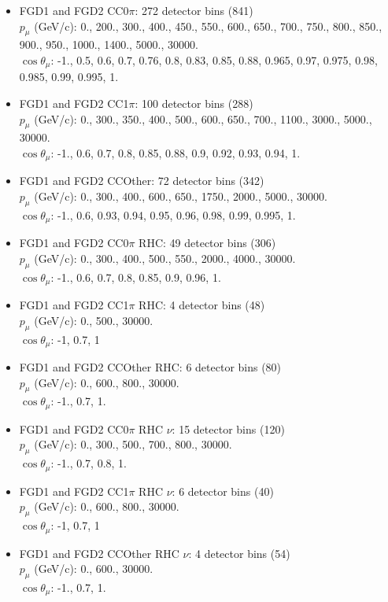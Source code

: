 \begin{itemize}
	\item FGD1 and FGD2 CC0$\pi$: 272 detector bins (841) \\
	$p_\mu$ (GeV/c): 0., 200., 300., 400., 450., 550., 600., 650., 700., 750., 800., 850., 900., 950., 1000., 1400., 5000., 30000.\\
	$\cos\theta_\mu$: -1., 0.5, 0.6, 0.7, 0.76, 0.8, 0.83, 0.85, 0.88, 0.965, 0.97, 0.975, 0.98, 0.985, 0.99, 0.995, 1.
	
	\item FGD1 and FGD2 CC1$\pi$: 100 detector bins (288) \\
	$p_\mu$ (GeV/c): 0., 300., 350., 400., 500., 600., 650., 700., 1100., 3000., 5000., 30000.\\
	$\cos\theta_\mu$: -1., 0.6, 0.7, 0.8, 0.85, 0.88, 0.9, 0.92, 0.93, 0.94, 1.
	
	\item FGD1 and FGD2 CCOther: 72 detector bins (342) \\
	$p_\mu$ (GeV/c): 0., 300., 400., 600., 650., 1750., 2000., 5000., 30000.\\
	$\cos\theta_\mu$: -1., 0.6, 0.93, 0.94, 0.95, 0.96, 0.98, 0.99, 0.995, 1.
	
	\item FGD1 and FGD2 CC0$\pi$ RHC: 49 detector bins (306) \\
	$p_\mu$ (GeV/c): 0., 300., 400., 500., 550., 2000., 4000., 30000.\\
	$\cos\theta_\mu$: -1., 0.6, 0.7, 0.8, 0.85, 0.9, 0.96, 1. 
	
	\item FGD1 and FGD2 CC1$\pi$ RHC: 4 detector bins (48) \\
	$p_\mu$ (GeV/c): 0., 500., 30000.\\
	$\cos\theta_\mu$: -1, 0.7, 1
	
	\item FGD1 and FGD2 CCOther RHC: 6 detector bins (80) \\
	$p_\mu$ (GeV/c): 0., 600., 800., 30000.\\
	$\cos\theta_\mu$: -1., 0.7, 1.
	
	\item FGD1 and FGD2 CC0$\pi$ RHC $\nu$: 15 detector bins (120) \\
	$p_\mu$ (GeV/c): 0., 300., 500., 700., 800., 30000.\\
	$\cos\theta_\mu$: -1., 0.7, 0.8, 1.
	
	\item FGD1 and FGD2 CC1$\pi$ RHC $\nu$: 6 detector bins (40) \\
	$p_\mu$ (GeV/c): 0., 600., 800., 30000.\\
	$\cos\theta_\mu$: -1, 0.7, 1
	
	\item FGD1 and FGD2 CCOther RHC $\nu$: 4 detector bins (54)\\
	$p_\mu$ (GeV/c): 0., 600., 30000.\\
	$\cos\theta_\mu$: -1., 0.7, 1.
\end{itemize}

